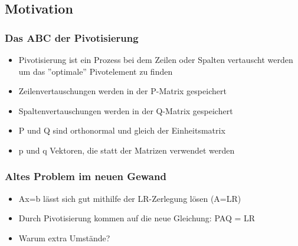 \documentclass[10pt]{beamer} %
\begin{document}
\subsection{Motivation}
\begin{frame}[fragile]
  \frametitle{Das ABC der Pivotisierung}
	\begin{itemize}[<+->]
		\item Pivotisierung ist ein Prozess bei dem Zeilen oder Spalten vertauscht werden um das ''optimale'' Pivotelement zu finden
		\vspace*{1em}
		\item Zeilenvertauschungen werden in der P-Matrix gespeichert
		\vspace*{1em}
		\item Spaltenvertauschungen werden in der Q-Matrix gespeichert
		\vspace*{1em}
		\item P und Q sind orthonormal und gleich der Einheitsmatrix
		\vspace*{1em}
		\item p und q Vektoren, die statt der Matrizen verwendet werden
	\end{itemize}
\end{frame}
\begin{frame}[fragile]
	\frametitle{Altes Problem im neuen Gewand}
	\begin{itemize}[<+->]
		\item Ax=b lässt sich gut mithilfe der LR-Zerlegung lösen (A=LR)
		\vspace*{1em}
		\item Durch Pivotisierung kommen auf die neue Gleichung: PAQ = LR
		\vspace*{1em}
		\item Warum extra Umstände?
	\end{itemize}
\end{frame}
\end{document}
